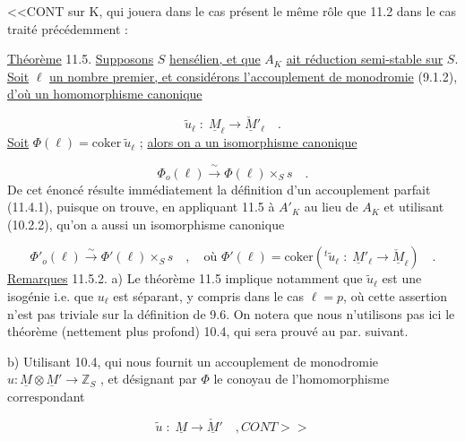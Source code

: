 
<<CONT sur K, qui jouera dans le cas présent le même rôle que 11.2 dans le cas traité précédemment :

\underline{Théorème} 11.5. \underline{Supposons} $S$ \underline{hensélien, et que} $A_K$ \underline{ait réduction semi-stable sur} $S$. \underline{Soit} $\ell$ \underline{un nombre premier, et considérons l'accouplement de monodromie} (9.1.2), \underline{d'où un homomorphisme canonique}

\begin{equation*}
\widetilde{u}_{\ell} \; : \; \underline{M}_{\ell} \longrightarrow \underline{\check{M}}'_{\ell} \quad .
\end{equation*}
\underline{Soit} $\Phi(\ell) = \mathrm{coker}\ \widetilde{u}_{\ell}$ ; \underline{alors on a un isomorphisme canonique}

\begin{equation}\tag{11.5.1}
\Phi_o(\ell) \xrightarrow{\ \sim\ } \Phi(\ell)\times_S s \quad .
\end{equation}
De cet énoncé résulte immédiatement la définition d'un accouplement parfait (11.4.1), puisque on trouve, en appliquant 11.5 à $A'_K$ au lieu de $A_K$ et utilisant (10.2.2), qu'on a aussi un isomorphisme canonique

\begin{equation*}
\Phi'_o(\ell) \xrightarrow{\ \sim\ } \Phi'(\ell)\times_S s \quad , \quad \text{où } \Phi'(\ell) = \mathrm{coker}({}^t\widetilde{u}_{\ell} \; : \; \underline{M}'_{\ell} \longrightarrow \underline{\check{M}}_{\ell}) \quad .
\end{equation*}
\underline{Remarques} 11.5.2. a) Le théorème 11.5 implique notamment que $\widetilde{u}_{\ell}$ est une isogénie i.e. que $u_{\ell}$ est séparant, y compris dans le cas $\ell = p$, où cette assertion n'est pas triviale sur la définition de 9.6. On notera que nous n'utilisons pas ici le théorème (nettement plus profond) 10.4, qui sera prouvé au par. suivant.

b) Utilisant 10.4, qui nous fournit un accouplement de monodromie $u: \underline{M} \otimes \underline{M}' \longrightarrow \mathbb{Z}_S$ , et désignant par $\Phi$ le conoyau de l'homomorphisme correspondant

\begin{equation*}
\widetilde{u} \; : \; \underline{M} \longrightarrow \underline{\check{M}}' \quad , CONT>>
\end{equation*}

